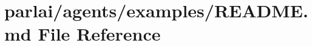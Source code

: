 \hypertarget{parlai_2agents_2examples_2README_8md}{}\section{parlai/agents/examples/\+R\+E\+A\+D\+ME.md File Reference}
\label{parlai_2agents_2examples_2README_8md}
